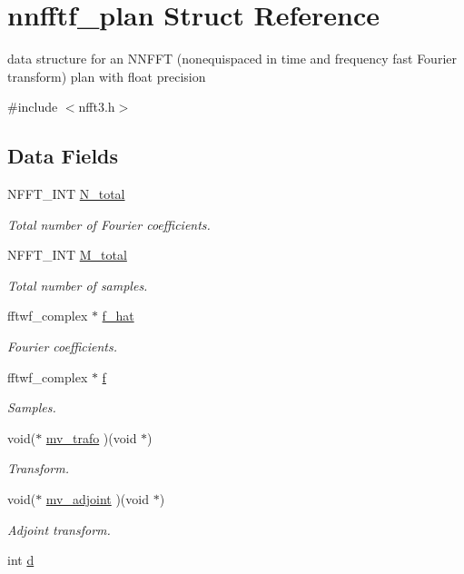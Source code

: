\hypertarget{structnnfftf__plan}{\section{nnfftf\-\_\-plan Struct Reference}
\label{structnnfftf__plan}
}


data structure for an N\-N\-F\-F\-T (nonequispaced in time and frequency fast Fourier transform) plan with float precision  




{\ttfamily \#include $<$nfft3.\-h$>$}

\subsection*{Data Fields}
\begin{DoxyCompactItemize}
\item 
N\-F\-F\-T\-\_\-\-I\-N\-T \hyperlink{structnnfftf__plan_ab718db4df19aece943e75ba1f0208e4e}{N\-\_\-total}
\begin{DoxyCompactList}\small\item\em Total number of Fourier coefficients. \end{DoxyCompactList}\item 
N\-F\-F\-T\-\_\-\-I\-N\-T \hyperlink{structnnfftf__plan_a95388092377754680ed77c8d6a087be4}{M\-\_\-total}
\begin{DoxyCompactList}\small\item\em Total number of samples. \end{DoxyCompactList}\item 
fftwf\-\_\-complex $\ast$ \hyperlink{structnnfftf__plan_a068de2b177ffaad5b0091b0ecd2ca211}{f\-\_\-hat}
\begin{DoxyCompactList}\small\item\em Fourier coefficients. \end{DoxyCompactList}\item 
fftwf\-\_\-complex $\ast$ \hyperlink{structnnfftf__plan_a458403c21a1083ede0d84a6d25c8cc8c}{f}
\begin{DoxyCompactList}\small\item\em Samples. \end{DoxyCompactList}\item 
void($\ast$ \hyperlink{structnnfftf__plan_aea4c2210478af70a540da01e0c0a1c7b}{mv\-\_\-trafo} )(void $\ast$)
\begin{DoxyCompactList}\small\item\em Transform. \end{DoxyCompactList}\item 
void($\ast$ \hyperlink{structnnfftf__plan_adcff4592ce1838e342b92633e9f8de42}{mv\-\_\-adjoint} )(void $\ast$)
\begin{DoxyCompactList}\small\item\em Adjoint transform. \end{DoxyCompactList}\item 
\hypertarget{structnnfftf__plan_ae6d3ce66c1d6d2fd0f507d83df91f549}{int \hyperlink{structnnfftf__plan_ae6d3ce66c1d6d2fd0f507d83df91f549}{d}}\label{structnnfftf__plan_ae6d3ce66c1d6d2fd0f507d83df91f549}


\end{DoxyCompactItemize}
